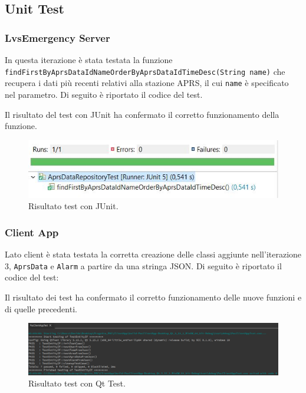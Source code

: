 \clearpage

\subsection{Unit Test}
\subsubsection{LvsEmergency Server}
In questa iterazione è stata testata la funzione \texttt{findFirstByAprsDataIdNameOrderByAprsDataIdTimeDesc(String name)} che recupera i dati più recenti relativi alla stazione APRS, il cui \texttt{name} è specificato nel parametro. Di seguito è riportato il codice del test.



Il risultato del test con JUnit ha confermato il corretto funzionamento della funzione.

\begin{figure}[h!]
	\centering
	\includegraphics[width=0.6\linewidth]{./Iterazione 3/ImageFiles/TestJUnit}
	\caption{Risultato test con JUnit.}
	\label{fig:RisultatiTestJunitIT3}
\end{figure}

\clearpage

\subsubsection{Client App}
Lato client è stata testata la corretta creazione delle classi aggiunte nell'iterazione 3, \texttt{AprsData} e \texttt{Alarm} a partire da una stringa JSON. Di seguito è riportato il codice del test: 



Il risultato dei test ha confermato il corretto funzionamento delle nuove funzioni e di quelle precedenti. 

\begin{figure}[h!]
	\centering
	\includegraphics[width=1\linewidth]{./Iterazione 3/ImageFiles/testQt}
	\caption{Risultato test con Qt Test.}
	\label{fig:RisultatiTestQtIT3}
\end{figure}
\clearpage

